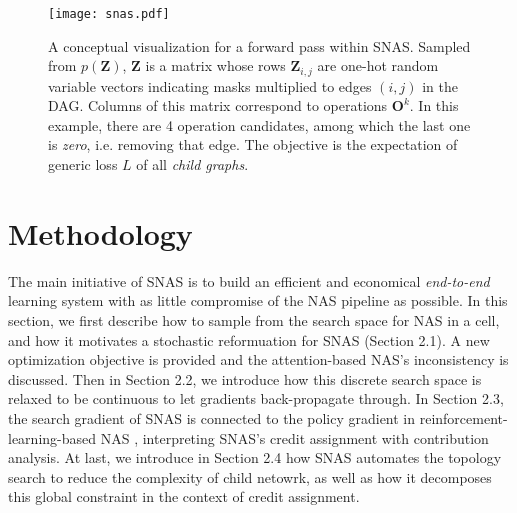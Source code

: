 \documentclass{article} \usepackage{iclr2019_conference,times}
\begin{document}
\begin{figure}[h]
  \centering
  \texttt{[image: snas.pdf]}
  \caption{A conceptual visualization for a forward pass within SNAS. Sampled from $p(\bm{Z})$, $\bm{Z}$ is a matrix whose rows $\bm{Z}_{i,j}$ are one-hot random variable vectors indicating masks multiplied to edges $(i, j)$ in the DAG. Columns of this matrix correspond to operations $\bm{O}^{k}$. In this example, there are 4 operation candidates, among which the last one is \textit{zero}, i.e. removing that edge. The objective is the expectation of generic loss $L$ of all \textit{child graphs}.}
  \label{fig:sampling}
\end{figure}

\section{Methodology}
The main initiative of SNAS is to build an efficient and economical \textit{end-to-end} learning system with as little compromise of the NAS pipeline as possible. In this section, we first describe how to sample from the search space for NAS in a cell, and how it motivates a stochastic reformuation for SNAS (Section 2.1). A new optimization objective is provided and the attention-based NAS's inconsistency is discussed. Then in Section 2.2, we introduce how this discrete search space is relaxed to be continuous to let gradients back-propagate through. In Section 2.3, the search gradient of SNAS is connected to the policy gradient in reinforcement-learning-based NAS \citep{zoph2016neural, pham2018efficient}, interpreting SNAS's credit assignment with contribution analysis. At last, we introduce in Section 2.4 how SNAS automates the topology search to reduce the complexity of child netowrk, as well as how it decomposes this global constraint in the context of credit assignment. 
\end{document}
